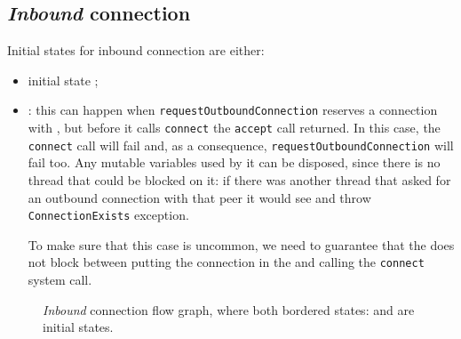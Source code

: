 \subsection{\textit{Inbound} connection}
Initial states for inbound connection are either:
\begin{itemize}
  \item initial state \InitialState{};
  \item \ReservedOutboundState{}:
    this can happen when \texttt{requestOutboundConnection}
    reserves a connection with \ReservedOutboundState{}, but before it calls
    \texttt{connect} the \texttt{accept} call returned.  In this case, the
    \texttt{connect} call will fail and, as a consequence,
    \texttt{requestOutboundConnection} will fail too. Any mutable variables
    used by it can be disposed, since there is no thread that could be blocked
    on it: if there was another thread that asked for an outbound connection
    with that peer it would see \ReservedOutboundState{} and throw
    \texttt{ConnectionExists} exception.

    To make sure that this case is uncommon, we need to guarantee that the
    \connmngr{} does not block between putting the connection in the
    \ReservedOutboundState{} and calling the \texttt{connect} system call.
\end{itemize}

\begin{figure}[h]
  \footnotesize{}
  \caption{\textit{Inbound} connection flow graph, where both bordered states:
  \ReservedOutboundState{} and \UnnegotiatedStateIn{} are initial states.}
\end{figure}

